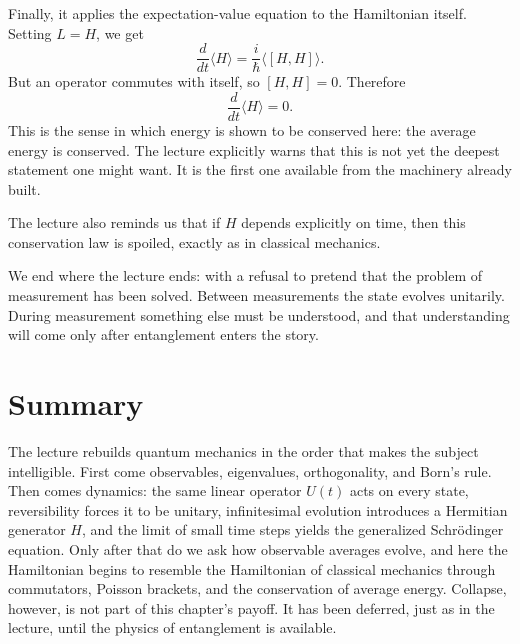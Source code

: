 Finally, it applies the expectation-value equation to the Hamiltonian itself. Setting \(L=H\), we get
\begin{equation}
\frac{d}{dt}\langle H\rangle=\frac{i}{\hbar}\langle [H,H]\rangle.
\end{equation}
But an operator commutes with itself, so \([H,H]=0\). Therefore
\begin{equation}
\frac{d}{dt}\langle H\rangle=0.
\end{equation}
This is the sense in which energy is shown to be conserved here: the average energy is conserved. The lecture explicitly warns that this is not yet the deepest statement one might want. It is the first one available from the machinery already built.

The lecture also reminds us that if \(H\) depends explicitly on time, then this conservation law is spoiled, exactly as in classical mechanics.

We end where the lecture ends: with a refusal to pretend that the problem of measurement has been solved. Between measurements the state evolves unitarily. During measurement something else must be understood, and that understanding will come only after entanglement enters the story.

\section{Summary}

The lecture rebuilds quantum mechanics in the order that makes the subject intelligible. First come observables, eigenvalues, orthogonality, and Born's rule. Then comes dynamics: the same linear operator \(U(t)\) acts on every state, reversibility forces it to be unitary, infinitesimal evolution introduces a Hermitian generator \(H\), and the limit of small time steps yields the generalized Schr\"odinger equation. Only after that do we ask how observable averages evolve, and here the Hamiltonian begins to resemble the Hamiltonian of classical mechanics through commutators, Poisson brackets, and the conservation of average energy. Collapse, however, is not part of this chapter's payoff. It has been deferred, just as in the lecture, until the physics of entanglement is available.